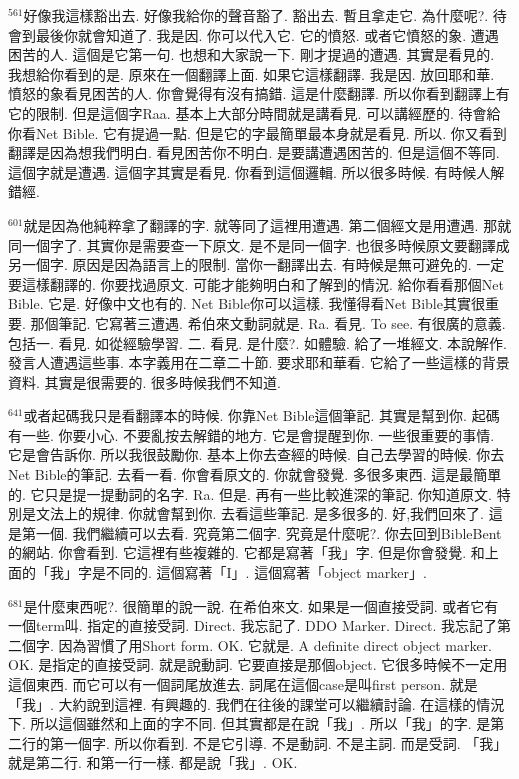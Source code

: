 \documentclass{book}
\begin{document}
$^{561}$好像我這樣豁出去.
好像我給你的聲音豁了.
豁出去.
暫且拿走它.
為什麼呢?.
待會到最後你就會知道了.
我是因.
你可以代入它.
它的憤怒.
或者它憤怒的象.
遭遇困苦的人.
這個是它第一句.
也想和大家說一下.
剛才提過的遭遇.
其實是看見的.
我想給你看到的是.
原來在一個翻譯上面.
如果它這樣翻譯.
我是因.
放回耶和華.
憤怒的象看見困苦的人.
你會覺得有沒有搞錯.
這是什麼翻譯.
所以你看到翻譯上有它的限制.
但是這個字Raa.
基本上大部分時間就是講看見.
可以講經歷的.
待會給你看Net Bible.
它有提過一點.
但是它的字最簡單最本身就是看見.
所以.
你又看到翻譯是因為想我們明白.
看見困苦你不明白.
是要講遭遇困苦的.
但是這個不等同.
這個字就是遭遇.
這個字其實是看見.
你看到這個邏輯.
所以很多時候.
有時候人解錯經.

$^{601}$就是因為他純粹拿了翻譯的字.
就等同了這裡用遭遇.
第二個經文是用遭遇.
那就同一個字了.
其實你是需要查一下原文.
是不是同一個字.
也很多時候原文要翻譯成另一個字.
原因是因為語言上的限制.
當你一翻譯出去.
有時候是無可避免的.
一定要這樣翻譯的.
你要找過原文.
可能才能夠明白和了解到的情況.
給你看看那個Net Bible.
它是.
好像中文也有的.
Net Bible你可以這樣.
我懂得看Net Bible其實很重要.
那個筆記.
它寫著三遭遇.
希伯來文動詞就是.
Ra.
看見.
To see.
有很廣的意義.
包括一.
看見.
如從經驗學習.
二.
看見.
是什麼?.
如體驗.
給了一堆經文.
本說解作.
發言人遭遇這些事.
本字義用在二章二十節.
要求耶和華看.
它給了一些這樣的背景資料.
其實是很需要的.
很多時候我們不知道.

$^{641}$或者起碼我只是看翻譯本的時候.
你靠Net Bible這個筆記.
其實是幫到你.
起碼有一些.
你要小心.
不要亂按去解錯的地方.
它是會提醒到你.
一些很重要的事情.
它是會告訴你.
所以我很鼓勵你.
基本上你去查經的時候.
自己去學習的時候.
你去Net Bible的筆記.
去看一看.
你會看原文的.
你就會發覺.
多很多東西.
這是最簡單的.
它只是提一提動詞的名字.
Ra.
但是.
再有一些比較進深的筆記.
你知道原文.
特別是文法上的規律.
你就會幫到你.
去看這些筆記.
是多很多的.
好,我們回來了.
這是第一個.
我們繼續可以去看.
究竟第二個字.
究竟是什麼呢?.
你去回到BibleBent的網站.
你會看到.
它這裡有些複雜的.
它都是寫著「我」字.
但是你會發覺.
和上面的「我」字是不同的.
這個寫著「I」.
這個寫著「object marker」.

$^{681}$是什麼東西呢?.
很簡單的說一說.
在希伯來文.
如果是一個直接受詞.
或者它有一個term叫.
指定的直接受詞.
Direct.
我忘記了.
DDO Marker.
Direct.
我忘記了第二個字.
因為習慣了用Short form.
OK.
它就是.
A definite direct object marker.
OK.
是指定的直接受詞.
就是說動詞.
它要直接是那個object.
它很多時候不一定用這個東西.
而它可以有一個詞尾放進去.
詞尾在這個case是叫first person.
就是「我」.
大約說到這裡.
有興趣的.
我們在往後的課堂可以繼續討論.
在這樣的情況下.
所以這個雖然和上面的字不同.
但其實都是在說「我」.
所以「我」的字.
是第二行的第一個字.
所以你看到.
不是它引導.
不是動詞.
不是主詞.
而是受詞.
「我」就是第二行.
和第一行一樣.
都是說「我」.
OK.
\end{document}
